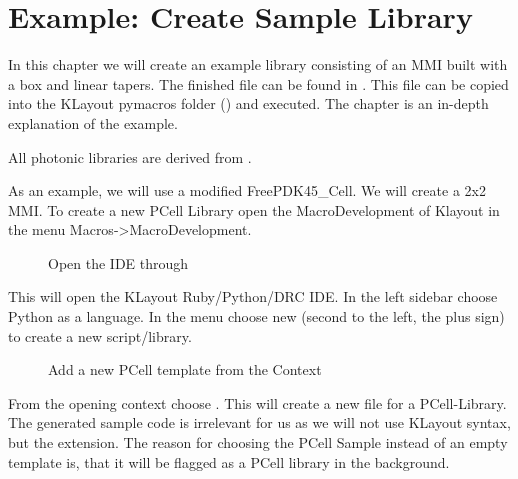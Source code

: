 \documentclass[a4paper,10pt,english]{sphinxmanual}
\begin{document}
\chapter{Example: Create Sample Library}
\label{\detokenize{example_library:example-create-sample-library}}\label{\detokenize{example_library::doc}}
In this chapter we will create an example library consisting of an MMI built with a box and linear tapers. The finished file can
be found in . This file can be copied into the KLayout pymacros folder () and executed. The chapter is an in-depth explanation of the example.

All photonic libraries are derived from {\hyperref[\detokenize{photonics:kppc.photonics.PhotDevice}]{}}.

As an example, we will use a modified FreePDK45\_Cell. We will create a 2x2 MMI.
To create a new PCell Library open the MacroDevelopment of Klayout in the menu Macros-\textgreater{}MacroDevelopment.

\begin{figure}[htbp]
\centering
\capstart

\noindent{}
\caption{Open the IDE through }\label{\detokenize{example_library:id1}}\end{figure}

This will open the KLayout Ruby/Python/DRC IDE. In the left sidebar choose Python as a language. In the menu choose
new (second to the left, the plus sign) to create a new script/library.

\begin{figure}[htbp]
\centering
\capstart

\noindent{}
\caption{Add a new PCell template from the Context}\label{\detokenize{example_library:id2}}\end{figure}

From the opening context choose . This will create a new  file for a PCell-Library.
The generated sample code is irrelevant for us as we will not use KLayout syntax, but the extension.
The reason for choosing the PCell Sample instead of an empty template is, that it will be flagged as a PCell library in
the background.
\end{document}

